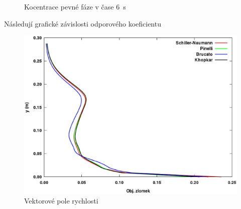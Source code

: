 \begin{figure}[h!]
\begin{center}
  \qquad
  \caption{Kocentrace pevné fáze v čase \SI{6}{\second}}
  \label{fig:count6}
  \end{center}
\end{figure}

\vspace{-9mm}

Následují grafické závislosti odporového koeficientu 

\newpage

\begin{figure}[h!]
\begin{center}
\includegraphics[scale=0.47]{images/Vol-2.eps}
\caption{Vektorové pole rychlosti}
\label{fig:vol2}
\end{center}
\end{figure} 

